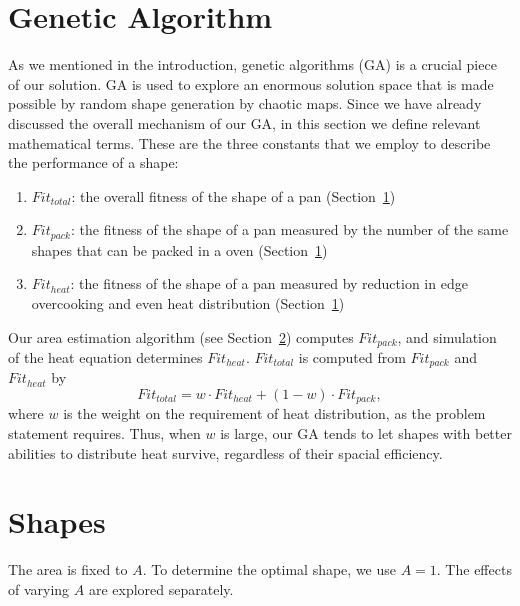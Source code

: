 \documentclass[12pt,draft]{reedmcm}
\begin{document}
\section{Genetic Algorithm}
\label{sec:ga}
As we mentioned in the introduction, genetic algorithms (GA) is a crucial piece of our solution.
GA is used to explore an enormous solution space that is made possible by random shape generation by chaotic maps.
Since we have already discussed the overall mechanism of our GA, in this section we define relevant mathematical terms.
These are the three constants that we employ to describe the performance of a shape:
\begin{enumerate}
  \item $Fit_{total}$: the overall fitness of the shape of a pan (Section~\ref{sec:ga})
  \item $Fit_{pack}$: the fitness of the shape of a pan measured by the number of the same shapes that can be packed in a oven (Section~\ref{sec:ga})
  \item $Fit_{heat}$:  the fitness of the shape of a pan measured by reduction in edge overcooking and even heat distribution (Section~\ref{sec:ga})
\end{enumerate}
Our area estimation algorithm (see Section~\ref{sec:shapes}) computes $Fit_{pack}$, and simulation of the heat equation determines $Fit_{heat}$.
$Fit_{total}$ is computed from $Fit_{pack}$ and $Fit_{heat}$ by
\begin{equation*}
  Fit_{total} = w \cdot Fit_{heat} + (1-w) \cdot Fit_{pack},
\end{equation*}
where $w$ is the weight on the requirement of heat distribution, as the problem statement requires.
Thus, when $w$ is large, our GA tends to let shapes with better abilities to distribute heat survive, regardless of their spacial efficiency.

\section{Shapes}
\label{sec:shapes}
The area is fixed to $A$. To determine the optimal shape, we use $A=1$. The effects of varying $A$ are explored separately.
\end{document}
